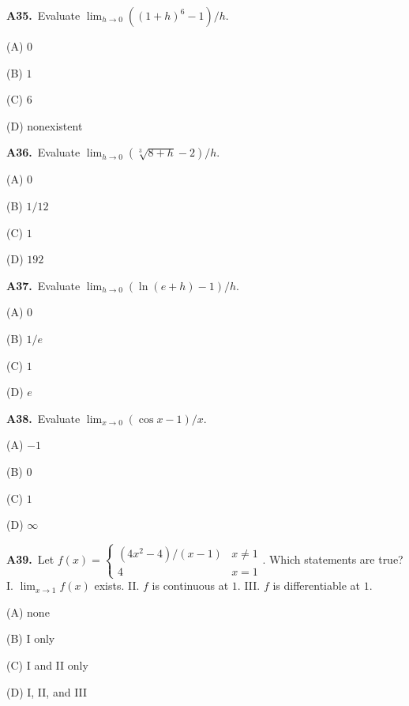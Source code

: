 \documentclass[11pt]{article}
\begin{document}
\bigskip\noindent\textbf{A35.}\ Evaluate $\lim_{h\to0}((1+h)^6-1)/h$.
\begin{list}{}{\setlength{\leftmargin}{3em}\setlength{\labelwidth}{2.5em}\setlength{\itemsep}{0pt}\setlength{\topsep}{2pt}}
\item[(A)] $0$
\item[(B)] $1$
\item[(C)] $6$
\item[(D)] nonexistent
\end{list}

\bigskip\noindent\textbf{A36.}\ Evaluate $\lim_{h\to0}(\sqrt[3]{8+h}-2)/h$.
\begin{list}{}{\setlength{\leftmargin}{3em}\setlength{\labelwidth}{2.5em}\setlength{\itemsep}{0pt}\setlength{\topsep}{2pt}}
\item[(A)] $0$
\item[(B)] $1/12$
\item[(C)] $1$
\item[(D)] $192$
\end{list}

\bigskip\noindent\textbf{A37.}\ Evaluate $\lim_{h\to0}(\ln(e+h)-1)/h$.
\begin{list}{}{\setlength{\leftmargin}{3em}\setlength{\labelwidth}{2.5em}\setlength{\itemsep}{0pt}\setlength{\topsep}{2pt}}
\item[(A)] $0$
\item[(B)] $1/e$
\item[(C)] $1$
\item[(D)] $e$
\end{list}

\bigskip\noindent\textbf{A38.}\ Evaluate $\lim_{x\to0}(\cos x-1)/x$.
\begin{list}{}{\setlength{\leftmargin}{3em}\setlength{\labelwidth}{2.5em}\setlength{\itemsep}{0pt}\setlength{\topsep}{2pt}}
\item[(A)] $-1$
\item[(B)] $0$
\item[(C)] $1$
\item[(D)] $\infty$
\end{list}

\bigskip\noindent\textbf{A39.}\ Let $f(x)=\begin{cases}(4x^2-4)/(x-1)&x\ne1\\4&x=1\end{cases}$. Which statements are true? I. $\lim_{x\to1}f(x)$ exists. II. $f$ is continuous at $1$. III. $f$ is differentiable at $1$.
\begin{list}{}{\setlength{\leftmargin}{3em}\setlength{\labelwidth}{2.5em}\setlength{\itemsep}{0pt}\setlength{\topsep}{2pt}}
\item[(A)] none
\item[(B)] I only
\item[(C)] I and II only
\item[(D)] I, II, and III
\end{list}
\end{document}
